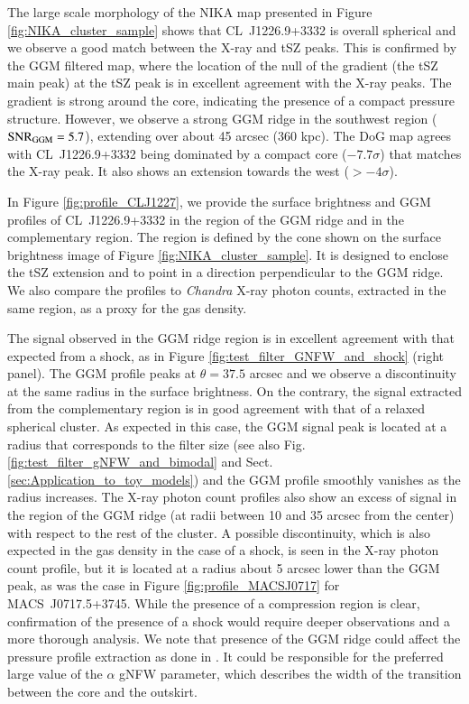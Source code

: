 \documentclass[traditabstract]{aa}
\begin{document}
The large scale morphology of the NIKA map presented in Figure \ref{fig:NIKA_cluster_sample} shows that \mbox{CL~J1226.9+3332} is overall spherical and we observe a good match between the X-ray and tSZ peaks. This is confirmed by the GGM filtered map, where the location of the null of the gradient (the tSZ main peak) at the tSZ peak is in excellent agreement with the X-ray peaks. The gradient is strong around the core, indicating the presence of a compact pressure structure. However, we observe a strong GGM ridge in the southwest region (${\rm SNR}_{\rm GGM} = 5.7$), extending over about 45 arcsec (360 kpc). The DoG map agrees with \mbox{CL~J1226.9+3332} being dominated by a compact core ($-7.7 \sigma$) that matches the X-ray peak. It also shows an extension towards the west ($> -4 \sigma$).

In Figure \ref{fig:profile_CLJ1227}, we provide the surface brightness and GGM profiles of \mbox{CL~J1226.9+3332} in the region of the GGM ridge and in the complementary region. The region is defined by the cone shown on the surface brightness image of Figure \ref{fig:NIKA_cluster_sample}. It is designed to enclose the tSZ extension and to point in a direction perpendicular to the GGM ridge. We also compare the profiles to \textit{Chandra} X-ray photon counts, extracted in the same region, as a proxy for the gas density.

The signal observed in the GGM ridge region is in excellent agreement with that expected from a shock, as in Figure \ref{fig:test_filter_GNFW_and_shock} (right panel). The GGM profile peaks at $\theta = 37.5$ arcsec and we observe a discontinuity at the same radius in the surface brightness. On the contrary, the signal extracted from the complementary region is in good agreement with that of a relaxed spherical cluster. As expected in this case, the GGM signal peak is located at a radius that corresponds to the filter size (see also Fig. \ref{fig:test_filter_gNFW_and_bimodal} and Sect. \ref{sec:Application_to_toy_models}) and the GGM profile smoothly vanishes as the radius increases. The X-ray photon count profiles also show an excess of signal in the region of the GGM ridge (at radii between 10 and 35 arcsec from the center) with respect to the rest of the cluster. A possible discontinuity, which is also expected in the gas density in the case of a shock, is seen in the X-ray photon count profile, but it is located at a radius about 5 arcsec lower than the GGM peak, as was the case in Figure \ref{fig:profile_MACSJ0717} for \mbox{MACS~J0717.5+3745}. While the presence of a compression region is clear, confirmation of the presence of a shock would require deeper observations and a more thorough analysis. We note that presence of the GGM ridge could affect the pressure profile extraction as done in \cite{Romero2017}. It could be responsible for the preferred large value of the $\alpha$ gNFW parameter, which describes the width of the transition between the core and the outskirt.
\end{document}
